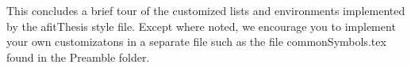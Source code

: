 This concludes a brief tour of the customized lists and environments
implemented by the afitThesis style file.  Except where noted, we
encourage you to implement your own customizatons in a separate file
such as the file commonSymbols.tex found in the Preamble folder.



